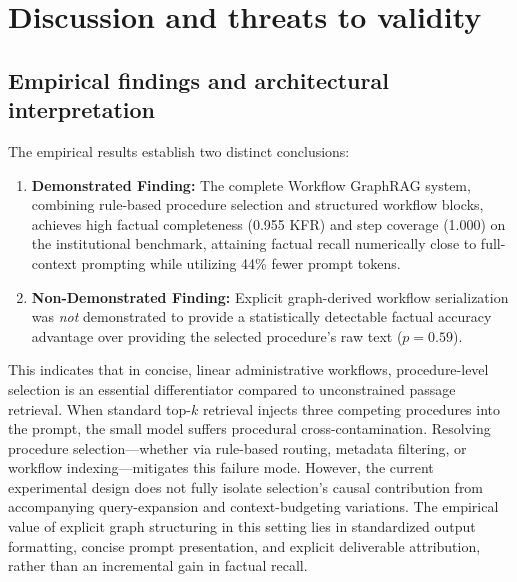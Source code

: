 \documentclass[preprint,10pt]{elsarticle}
\begin{document}
\section{Discussion and threats to validity}
\label{sec:discussion}

\subsection{Empirical findings and architectural interpretation}
The empirical results establish two distinct conclusions:
\begin{enumerate}[leftmargin=*]
\item \textbf{Demonstrated Finding:} The complete Workflow GraphRAG system, combining rule-based procedure selection and structured workflow blocks, achieves high factual completeness (0.955 KFR) and step coverage (1.000) on the institutional benchmark, attaining factual recall numerically close to full-context prompting while utilizing 44\% fewer prompt tokens.
\item \textbf{Non-Demonstrated Finding:} Explicit graph-derived workflow serialization was \emph{not} demonstrated to provide a statistically detectable factual accuracy advantage over providing the selected procedure's raw text ($p = 0.59$).
\end{enumerate}

This indicates that in concise, linear administrative workflows, procedure-level selection is an essential differentiator compared to unconstrained passage retrieval. When standard top-$k$ retrieval injects three competing procedures into the prompt, the small model suffers procedural cross-contamination. Resolving procedure selection---whether via rule-based routing, metadata filtering, or workflow indexing---mitigates this failure mode. However, the current experimental design does not fully isolate selection's causal contribution from accompanying query-expansion and context-budgeting variations. The empirical value of explicit graph structuring in this setting lies in standardized output formatting, concise prompt presentation, and explicit deliverable attribution, rather than an incremental gain in factual recall.
\end{document}
